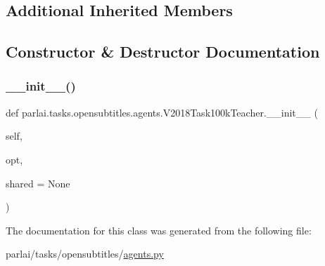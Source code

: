 \subsection*{Additional Inherited Members}


\subsection{Constructor \& Destructor Documentation}
\mbox{\label{classparlai_1_1tasks_1_1opensubtitles_1_1agents_1_1V2018Task100kTeacher_a7a99a122c49fcc88a4a9f5261a4fefcb}} 
\subsubsection{\texorpdfstring{\+\_\+\+\_\+init\+\_\+\+\_\+()}{\_\_init\_\_()}}
{\footnotesize\ttfamily def parlai.\+tasks.\+opensubtitles.\+agents.\+V2018\+Task100k\+Teacher.\+\_\+\+\_\+init\+\_\+\+\_\+ (\begin{DoxyParamCaption}\item[{}]{self,  }\item[{}]{opt,  }\item[{}]{shared = {\ttfamily None} }\end{DoxyParamCaption})}



The documentation for this class was generated from the following file\+:\begin{DoxyCompactItemize}
\item 
parlai/tasks/opensubtitles/\hyperlink{parlai_2tasks_2opensubtitles_2agents_8py}{agents.\+py}\end{DoxyCompactItemize}
